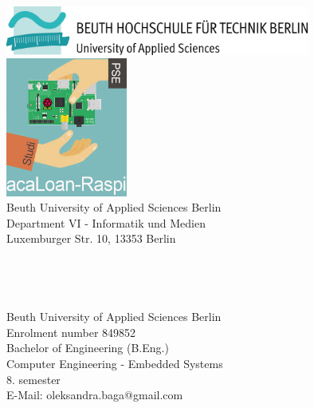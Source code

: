 \begin{titlepage}
	\tgherosfont
	\centering

	\includegraphics[width=10cm]{gfx/Beuth-Logo_horizontal} \\[8mm]
	\includegraphics[width=4cm]{gfx/csm_acaLoan-Raspi} \\[0mm]

    {\normalsize Beuth University of Applied Sciences Berlin}\\
    {\normalsize Department VI  - Informatik und Medien}\\
    {\normalsize Luxemburger Str. 10, 13353 Berlin}\\[10mm]

	{\LARGE \color{ctcolortitle}\textbf{\thesisTitle}}\\[5mm]
	{\color{ctcolortitle}\textbf{\thesisTitleEng}}\\[10mm]
	{\LARGE \color{ctcolortitle}\textbf{\thesisTitleDe}}\\[10mm]
	
	{\LARGE \thesisName} \\[5mm]
	    {\normalsize Beuth University of Applied Sciences Berlin} \\
    {\normalsize Enrolment number 849852} \\
	{\normalsize Bachelor of Engineering (B.Eng.)} \\
	{\normalsize Computer Engineering -  Embedded Systems} \\
    {\small 8. semester} \\[5mm]

	{\small E-Mail: oleksandra.baga@gmail.com} \\


\end{titlepage}
